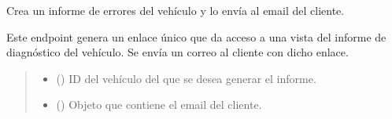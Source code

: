 \documentclass[letterpaper,10pt,spanish]{sphinxmanual}
\begin{document}
\begin{fulllineitems}

\begin{fulllineitems}
\label{\detokenize{endpoints:main.VehiculoRegistro.year}}
\pysigstartsignatures
\pysigline
{}
\pysigstopsignatures
\end{fulllineitems}


\end{fulllineitems}


\begin{fulllineitems}
\label{\detokenize{endpoints:main.crear_informe}}
\pysigstartsignatures
\pysiglinewithargsret
{}
{\sphinxparamcomma {}\sphinxparamcomma {}\sphinxparamcomma {}}
{}
\pysigstopsignatures
\sphinxAtStartPar
Crea un informe de errores del vehículo y lo envía al email del cliente.

\sphinxAtStartPar
Este endpoint genera un enlace único que da acceso a una vista del informe de diagnóstico del vehículo. Se envía un correo al cliente con dicho enlace.
\begin{quote}\begin{description}
\begin{itemize}
\item {} 
\sphinxAtStartPar
{} () \textendash{} ID del vehículo del que se desea generar el informe.

\item {} 
\sphinxAtStartPar
{} ({\hyperref[\detokenize{modelos:main.InformeRequest}]{}}) \textendash{} Objeto que contiene el email del cliente.


\end{itemize}
\end{description}
\end{quote}
\end{fulllineitems}
\end{document}
